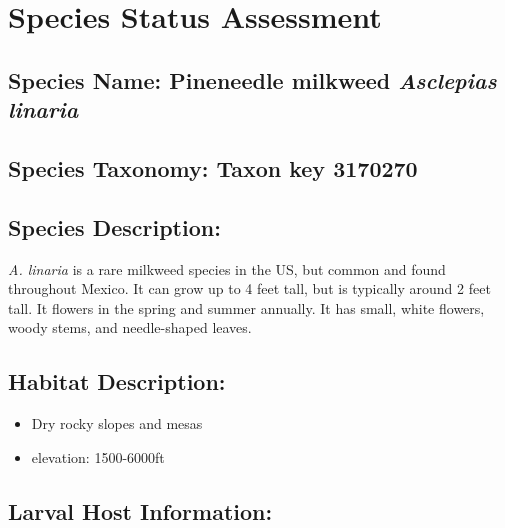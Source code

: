 \documentclass[
]{article}
\author{}
\date{\vspace{-2.5em}}
\providecommand{\tightlist}{%
  \setlength{\itemsep}{0pt}\setlength{\parskip}{0pt}}
\begin{document}
\hypertarget{species-status-assessment}{%
\section{Species Status Assessment}\label{species-status-assessment}}

\hypertarget{species-name-pineneedle-milkweed-asclepias-linaria}{%
\subsection{\texorpdfstring{Species Name: Pineneedle milkweed
\emph{Asclepias
linaria}}{Species Name: Pineneedle milkweed Asclepias linaria}}\label{species-name-pineneedle-milkweed-asclepias-linaria}}

\hypertarget{species-taxonomy-taxon-key-3170270}{%
\subsection{Species Taxonomy: Taxon key
3170270}\label{species-taxonomy-taxon-key-3170270}}

\hypertarget{species-description}{%
\subsection{Species Description:}\label{species-description}}

\emph{A. linaria} is a rare milkweed species in the US, but common and
found throughout Mexico. It can grow up to 4 feet tall, but is typically
around 2 feet tall. It flowers in the spring and summer annually. It has
small, white flowers, woody stems, and needle-shaped leaves.

\hypertarget{habitat-description}{%
\subsection{Habitat Description:}\label{habitat-description}}

\begin{itemize}
\tightlist
\item
  Dry rocky slopes and mesas
\item
  elevation: 1500-6000ft
\end{itemize}

\hypertarget{larval-host-information}{%
\subsection{Larval Host Information:}\label{larval-host-information}}
\end{document}
